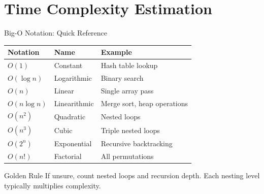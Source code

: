 \documentclass[aspectratio=169,xcolor=dvipsnames]{beamer}
\begin{document}
\section{Time Complexity Estimation}

\begin{frame}{Big-O Notation: Quick Reference}
  \begin{table}
    \centering
    \small
    \begin{tabular}{lll}
      \hline
      \textbf{Notation} & \textbf{Name} & \textbf{Example} \\
      \hline
      $O(1)$ & Constant & Hash table lookup \\
      $O(\log n)$ & Logarithmic & Binary search \\
      $O(n)$ & Linear & Single array pass \\
      $O(n \log n)$ & Linearithmic & Merge sort, heap operations \\
      $O(n^2)$ & Quadratic & Nested loops \\
      $O(n^3)$ & Cubic & Triple nested loops \\
      $O(2^n)$ & Exponential & Recursive backtracking \\
      $O(n!)$ & Factorial & All permutations \\
      \hline
    \end{tabular}
  \end{table}

  \vspace{0.3cm}
  \begin{alertblock}{Golden Rule}
    If unsure, count nested loops and recursion depth. Each nesting level typically multiplies complexity.
  \end{alertblock}
\end{frame}
\end{document}
